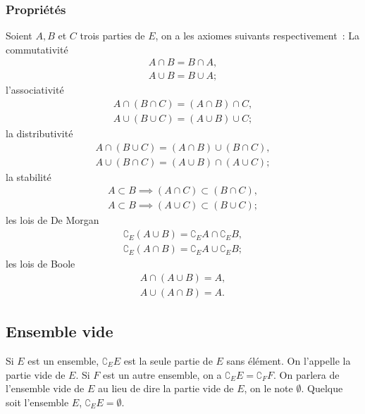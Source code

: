 \subsubsection{Propriétés}
\label{chap3-subsubsec:prop}
\begin{prop}
  Soient $A, B$ et $C$ trois parties de $E$, on a les axiomes suivants respectivement~: 
  La commutativité
  \begin{gather}
     A \cap B= B \cap A, \\  
     A \cup B=B \cup A;
  \end{gather}
  l'associativité
  \begin{gather}
    A \cap (B \cap C)=(A \cap B) \cap C, \\ 
    A \cup (B \cup C)=(A \cup B) \cup C;
  \end{gather}
  la distributivité
  \begin{gather}
    A \cap (B \cup C)=(A \cap B) \cup (B \cap C), \\ 
    A \cup (B \cap C)=(A \cup B) \cap (A \cup C);
  \end{gather}
  la stabilité
  \begin{gather}
    A \subset B \implies (A \cap C) \subset (B \cap C), \\ 
    A \subset B \implies (A \cup C) \subset (B \cup C);
  \end{gather}
  les lois de De Morgan
  \begin{gather}
    \complement_E (A \cup B)=\complement_E A \cap \complement_E B, \\ 
    \complement_E (A \cap B)=\complement_E A \cup \complement_E B;
  \end{gather}
  les lois de Boole
  \begin{gather}
    A \cap (A \cup B)=A, \\ 
    A \cup (A \cap B)=A.
  \end{gather}
\end{prop}
%
\subsection{Ensemble vide}
\label{chap3-subsec:ensemblevide}
Si $E$ est un ensemble, $\complement_E E$ est la seule partie de $E$ sans élément. On l'appelle la partie vide de $E$. Si $F$ est un autre ensemble, on a $\complement_E E = \complement_F F$. On parlera de l'ensemble vide de $E$ au lieu de dire la partie vide de $E$, on le note $\emptyset$. Quelque soit l'ensemble $E$, $\complement_E E =\emptyset$.


